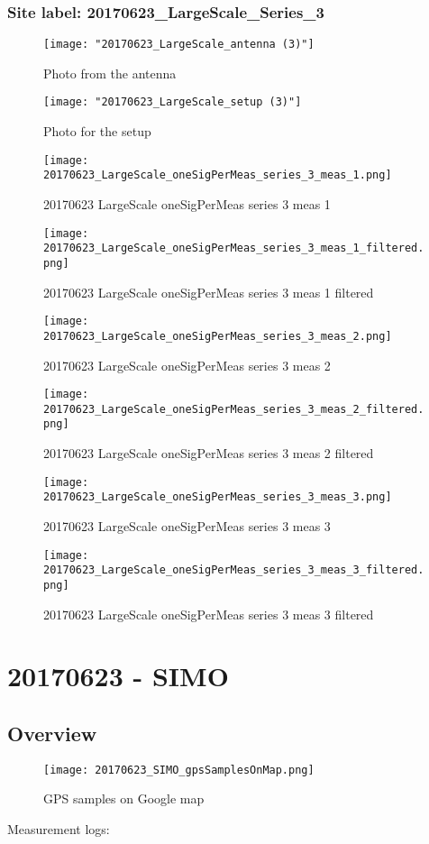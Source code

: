 \subsubsection{Site label: 20170623\_LargeScale\_Series\_3}
\begin{figure}[ht] \caption{Photo from the antenna}
\texttt{[image: "20170623\_LargeScale\_antenna (3)"]}\centering\end{figure}
\begin{figure}[ht] \caption{Photo for the setup}
\texttt{[image: "20170623\_LargeScale\_setup (3)"]}\centering\end{figure}
\begin{figure}[ht] \caption{20170623 LargeScale oneSigPerMeas series 3 meas 1}
\texttt{[image: 20170623\_LargeScale\_oneSigPerMeas\_series\_3\_meas\_1.png]}\centering\end{figure}
\begin{figure}[ht] \caption{20170623 LargeScale oneSigPerMeas series 3 meas 1 filtered}
\texttt{[image: 20170623\_LargeScale\_oneSigPerMeas\_series\_3\_meas\_1\_filtered.png]}\centering\end{figure}
\begin{figure}[ht] \caption{20170623 LargeScale oneSigPerMeas series 3 meas 2}
\texttt{[image: 20170623\_LargeScale\_oneSigPerMeas\_series\_3\_meas\_2.png]}\centering\end{figure}
\begin{figure}[ht] \caption{20170623 LargeScale oneSigPerMeas series 3 meas 2 filtered}
\texttt{[image: 20170623\_LargeScale\_oneSigPerMeas\_series\_3\_meas\_2\_filtered.png]}\centering\end{figure}
\begin{figure}[ht] \caption{20170623 LargeScale oneSigPerMeas series 3 meas 3}
\texttt{[image: 20170623\_LargeScale\_oneSigPerMeas\_series\_3\_meas\_3.png]}\centering\end{figure}
\begin{figure}[ht] \caption{20170623 LargeScale oneSigPerMeas series 3 meas 3 filtered}
\texttt{[image: 20170623\_LargeScale\_oneSigPerMeas\_series\_3\_meas\_3\_filtered.png]}\centering\end{figure}
\clearpage
\section{20170623 - SIMO}
\subsection{Overview}
\begin{figure}[ht] \caption{GPS samples on Google map}
\texttt{[image: 20170623\_SIMO\_gpsSamplesOnMap.png]}\centering\end{figure}
\begin{minipage}{\textwidth} Measurement logs:

 \end{minipage}
\clearpage
